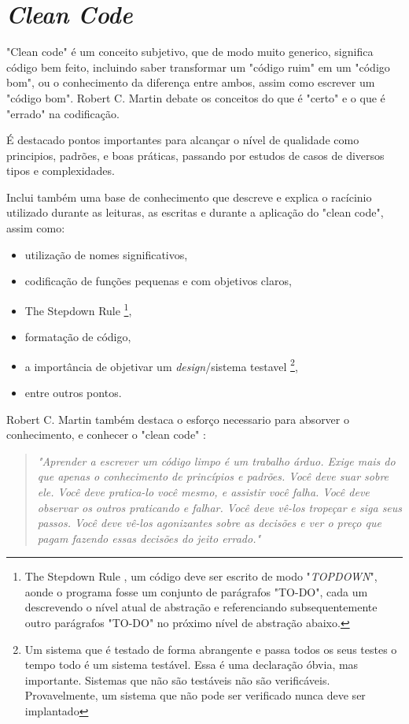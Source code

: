 \documentclass[12pt]{article}
\begin{document}
\section{\textit{Clean Code}} \label{sec:cleancode}


"Clean code" \cite{ROBERT_MARTIN_CLEAN_CODE} é um conceito subjetivo, que de modo muito generico, significa código bem feito, incluindo saber transformar um "código ruim" em um "código bom", ou o conhecimento da diferença entre ambos, assim como escrever um "código bom". Robert C. Martin \cite{ROBERT_MARTIN_CLEAN_CODE} debate os conceitos do que é "certo" e o que é "errado" na codificação.

É destacado pontos importantes para alcançar o nível de qualidade como principios, padrões, e boas práticas, passando por estudos de casos de diversos tipos e complexidades.

Inclui também uma base de conhecimento que descreve e explica o racícinio utilizado durante as leituras, as escritas e durante a aplicação do "clean code", assim como:
\begin{itemize}
 \item utilização de nomes significativos,
 \item codificação de funções pequenas e com objetivos claros,
 \item The Stepdown Rule \footnote{The Stepdown Rule \cite{ROBERT_MARTIN_CLEAN_CODE}, um código deve ser escrito de modo "\textit{TOPDOWN}", aonde o programa fosse um conjunto de parágrafos "TO-DO", cada um descrevendo o nível atual de abstração e referenciando subsequentemente outro parágrafos "TO-DO" no próximo nível de abstração abaixo.},
 \item formatação de código,
 \item a importância de objetivar um \textit{design}/sistema testavel \footnote{Um sistema que é testado de forma abrangente e passa todos os seus testes o tempo todo é um sistema testável. Essa é uma declaração óbvia, mas importante. Sistemas que não são testáveis
não são verificáveis. Provavelmente, um sistema que não pode ser verificado nunca deve ser implantado},
 \item entre outros pontos. 
\end{itemize}
Robert C. Martin \cite{ROBERT_MARTIN_CLEAN_CODE} também destaca o esforço necessario para absorver o conhecimento, e conhecer o "clean code" \cite{ROBERT_MARTIN_CLEAN_CODE}:

\begin{quotation}
\textit{"Aprender a escrever um código limpo é um trabalho árduo. Exige mais do que apenas o conhecimento de princípios e padrões. Você deve suar sobre ele. Você deve pratica-lo você mesmo, e assistir você falha. Você deve observar os outros praticando e falhar. Você deve vê-los tropeçar e siga seus passos. Você deve vê-los agonizantes sobre as decisões e ver o preço que pagam fazendo essas decisões do jeito errado." }
\end{quotation}
\end{document}
